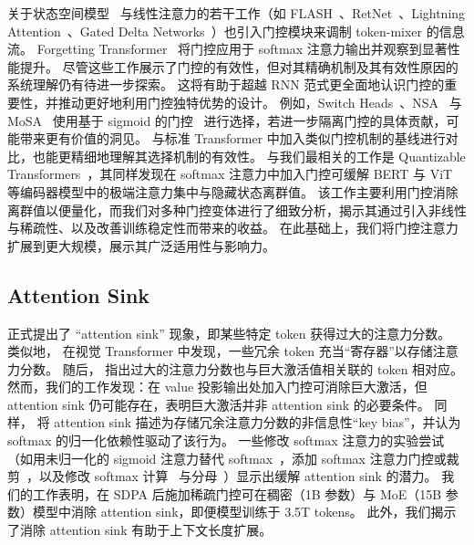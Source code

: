 \documentclass{article} %
\begin{document}
关于状态空间模型~\citep{gu2023mamba,mamba2} 与线性注意力的若干工作（如 FLASH~\citep{hua2022transformer}、RetNet~\citep{sun2023retentivenetworksuccessortransformer}、Lightning Attention~\citep{qin2024lightning, qin2024various, li2025minimax}、Gated Delta Networks~\citep{yang2024gated}）也引入门控模块来调制 token-mixer 的信息流。
Forgetting Transformer~\citep{lin2025forgetting} 将门控应用于 softmax 注意力输出并观察到显著性能提升。
尽管这些工作展示了门控的有效性，但对其精确机制及其有效性原因的系统理解仍有待进一步探索。
这将有助于超越 RNN 范式更全面地认识门控的重要性，并推动更好地利用门控独特优势的设计。
例如，Switch Heads~\citep{csordas2024switchhead, csordas2024moeut}、NSA~\citep{yuan2025native} 与 MoSA~\citep{piękos2025mixturesparseattentioncontentbased} 使用基于 sigmoid 的门控~\citep{csordas2023approximating} 进行选择，若进一步隔离门控的具体贡献，可能带来更有价值的洞见。
与标准 Transformer 中加入类似门控机制的基线进行对比，也能更精细地理解其选择机制的有效性。
与我们最相关的工作是 Quantizable Transformers~\citep{bondarenko2023quantizable}，其同样发现在 softmax 注意力中加入门控可缓解 BERT 与 ViT 等编码器模型中的极端注意力集中与隐藏状态离群值。
该工作主要利用门控消除离群值以便量化，而我们对多种门控变体进行了细致分析，揭示其通过引入非线性与稀疏性、以及改善训练稳定性而带来的收益。
在此基础上，我们将门控注意力扩展到更大规模，展示其广泛适用性与影响力。

\subsection{Attention Sink}

\citet{xiao2023efficient} 正式提出了 “attention sink” 现象，即某些特定 token 获得过大的注意力分数。
类似地，\citet{darcet2023vision} 在视觉 Transformer 中发现，一些冗余 token 充当“寄存器”以存储注意力分数。
随后，\citet{sun2024massive} 指出过大的注意力分数也与巨大激活值相关联的 token 相对应。
然而，我们的工作发现：在 value 投影输出处加入门控可消除巨大激活，但 attention sink 仍可能存在，表明巨大激活并非 attention sink 的必要条件。
同样，\citet{gu2024attention} 将 attention sink 描述为存储冗余注意力分数的非信息性“key bias”，并认为 softmax 的归一化依赖性驱动了该行为。
一些修改 softmax 注意力的实验尝试（如用未归一化的 sigmoid 注意力替代 softmax~\citep{ramapuram2024theory, gu2024attention}，添加 softmax 注意力门控或裁剪~\citep{bondarenko2023quantizable}，以及修改 softmax 计算~\citep{zuhri2025softpickattentionsinkmassive} 与分母~\citep{miller2023offone}）显示出缓解 attention sink 的潜力。
我们的工作表明，在 SDPA 后施加稀疏门控可在稠密（1B 参数）与 MoE（15B 参数）模型中消除 attention sink，即便模型训练于 3.5T tokens。
此外，我们揭示了消除 attention sink 有助于上下文长度扩展。
\end{document}
